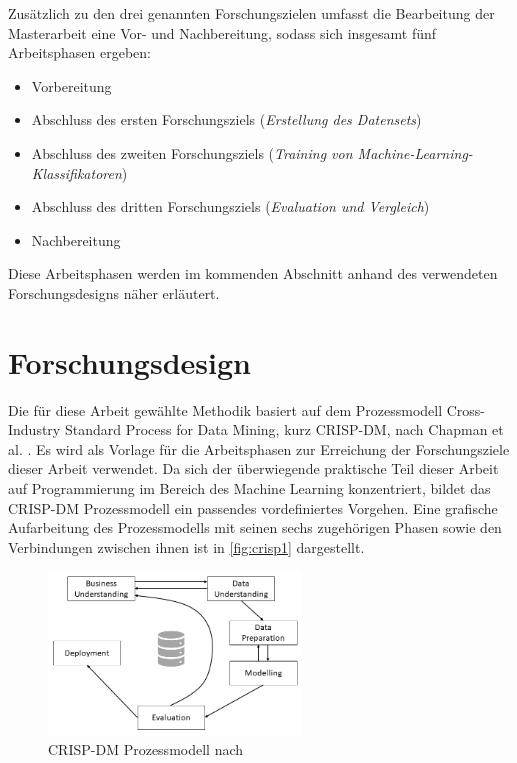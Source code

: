\label{phases_definition}

Zusätzlich zu den drei genannten Forschungszielen umfasst die Bearbeitung der Masterarbeit eine Vor- und Nachbereitung, sodass sich insgesamt fünf Arbeitsphasen ergeben:

\begin{itemize}
\setlength{\itemsep}{-2pt}
\item Vorbereitung
\item Abschluss des ersten Forschungsziels (\textit{Erstellung des Datensets})
\item Abschluss des zweiten Forschungsziels (\textit{Training von Machine-Learning-Klassifikatoren})
\item Abschluss des dritten Forschungsziels (\textit{Evaluation und Vergleich})
\item Nachbereitung
\end{itemize}

Diese Arbeitsphasen werden im kommenden Abschnitt anhand des verwendeten Forschungsdesigns näher erläutert.

\section{Forschungsdesign}

Die für diese Arbeit gewählte Methodik basiert auf dem Prozessmodell \glqq Cross-Industry Standard Process for Data Mining\grqq, kurz CRISP-DM, nach Chapman et al. \cite{Chapman2000}. Es wird als Vorlage für die Arbeitsphasen zur Erreichung der Forschungsziele dieser Arbeit verwendet. Da sich der überwiegende praktische Teil dieser Arbeit auf Programmierung im Bereich des Machine Learning konzentriert, bildet das CRISP-DM Prozessmodell ein passendes vordefiniertes Vorgehen. Eine grafische Aufarbeitung des Prozessmodells mit seinen sechs zugehörigen Phasen sowie den Verbindungen zwischen ihnen ist in \autoref{fig:crisp1} dargestellt. 

\begin{figure}[t]
    \centering
    \includegraphics[width=0.6\textwidth]{images/CRISP-DM1}
    \caption{CRISP-DM Prozessmodell nach \cite{Chapman2000}}\label{fig:crisp1}
\end{figure}

